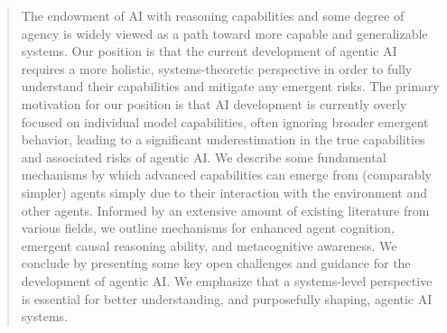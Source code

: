 \documentclass{article}
\theoremstyle{plain}
\theoremstyle{definition}
\theoremstyle{remark}
\begin{document}
\printAffiliationsAndNotice{}  %




\begin{abstract}
The endowment of AI with reasoning capabilities and some degree of agency is widely viewed as a path toward more capable and generalizable systems. Our position is that the current development of agentic AI requires a more holistic, systems-theoretic perspective in order to fully understand their capabilities and mitigate any emergent risks. The primary motivation for our position is that AI development is currently overly focused on individual model capabilities, often ignoring broader emergent behavior, leading to a significant underestimation in the true capabilities and associated risks of agentic AI. We describe some fundamental mechanisms by which advanced capabilities can emerge from (comparably simpler) agents simply due to their interaction with the environment and other agents. Informed by an extensive amount of existing literature from various fields, we outline mechanisms for enhanced agent cognition, emergent causal reasoning ability, and metacognitive awareness. We conclude by presenting some key open challenges and guidance for the development of agentic AI. We emphasize that a systems-level perspective is essential for better understanding, and purposefully shaping, agentic AI systems.
\end{abstract}

%
%
%
%
%
%
\end{document}
